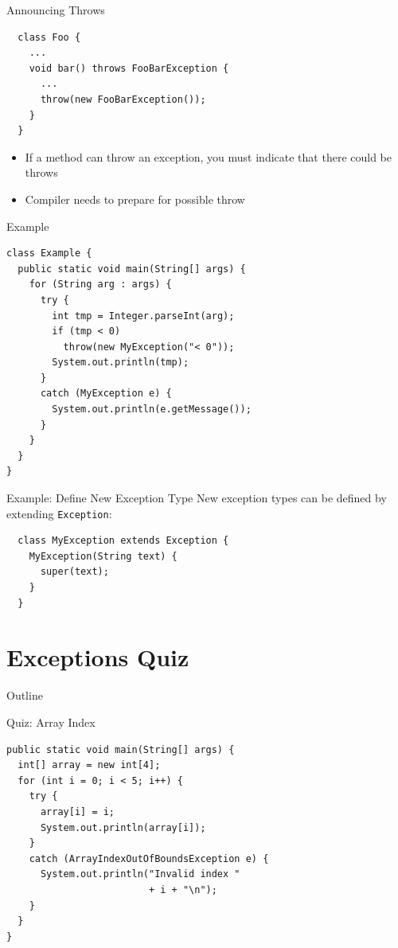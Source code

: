 \begin{frame}[fragile]{Announcing Throws}
  \begin{lstlisting}
  class Foo {
    ...
    void bar() throws FooBarException {
      ...
      throw(new FooBarException());
    } 
  }
  \end{lstlisting}

  \begin{itemize}
  \item If a method can throw an exception, you must indicate that
    there could be throws
  \item Compiler needs to prepare for possible throw
  \end{itemize}
\end{frame}

\begin{frame}[fragile]{Example}
  \begin{lstlisting}
class Example {
  public static void main(String[] args) {
    for (String arg : args) {
      try {		
        int tmp = Integer.parseInt(arg);
        if (tmp < 0)
          throw(new MyException("< 0"));
        System.out.println(tmp);    
      }    
      catch (MyException e) {
        System.out.println(e.getMessage()); 
      }
    } 
  }		
}
  \end{lstlisting}
\end{frame}

\begin{frame}[fragile]{Example: Define New Exception Type}
  New exception types can be defined by extending
  \lstinline{Exception}:


  \begin{lstlisting}
  class MyException extends Exception {
    MyException(String text) {
      super(text);
    }
  }
  \end{lstlisting}
\end{frame}


\section{Exceptions Quiz}

\begin{frame}{Outline}
  \tableofcontents[current]
\end{frame}

\begin{frame}[fragile]{Quiz: Array Index}
  \begin{lstlisting}
public static void main(String[] args) {
  int[] array = new int[4];
  for (int i = 0; i < 5; i++) {
    try {
      array[i] = i;
      System.out.println(array[i]);
    } 
    catch (ArrayIndexOutOfBoundsException e) {
      System.out.println("Invalid index " 
                         + i + "\n");
    }
  }
}
  \end{lstlisting}
\end{frame}

